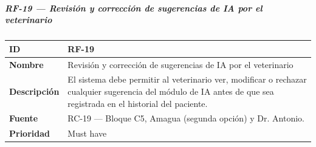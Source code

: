 \subparagraph{RF-19 --- Revisión y corrección de sugerencias de IA por
el
veterinario}\label{rf-19-revisiuxf3n-y-correcciuxf3n-de-sugerencias-de-ia-por-el-veterinario}

{\def\LTcaptype{none} %
\begin{longtable}[]{@{}
  >{\raggedright\arraybackslash}p{}
  >{\raggedright\arraybackslash}p{}@{}}
\toprule\noalign{}
\begin{minipage}[b]{\linewidth}\raggedright
\textbf{ID}
\end{minipage} & \begin{minipage}[b]{\linewidth}\raggedright
RF-19
\end{minipage} \\
\midrule\noalign{}
\endhead
\bottomrule\noalign{}
\endlastfoot
\textbf{Nombre} & \begin{minipage}[t]{\linewidth}\raggedright
Revisión y corrección de sugerencias de IA por el veterinario
\end{minipage} \\
\textbf{Descripción} & \begin{minipage}[t]{\linewidth}\raggedright
El sistema debe permitir al veterinario ver, modificar o rechazar
cualquier sugerencia del módulo de IA antes de que sea registrada en el
historial del paciente.
\end{minipage} \\
\textbf{Fuente} & \begin{minipage}[t]{\linewidth}\raggedright
RC-19 --- Bloque C5, Amagua (segunda opción) y Dr. Antonio.
\end{minipage} \\
\textbf{Prioridad} & \begin{minipage}[t]{\linewidth}\raggedright
Must have
\end{minipage} \\
\end{longtable}
}

